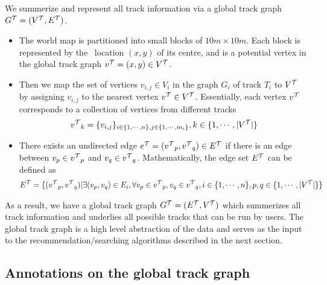 We summerize and represent all track information via a global track graph ${G^{\mathcal{T}}}=({V^{\mathcal{T}}},{E^{\mathcal{T}}})$.
\begin{itemize}
	\item The world map is partitioned into small blocks of $10m\times10m$. Each block is represented by the \gps\ location $(x,y)$ of its centre, and is a potential vertex in the global track graph ${v^{\mathcal{T}}}=(x,y)\in{V^{\mathcal{T}}}$. 
	\item Then we map the set of vertices $v_{i,j}\in V_i$ in the graph $G_i$ of track $T_i$ to ${V^{\mathcal{T}}}$ by assigning $v_{i,j}$ to the nearest vertex ${v^{\mathcal{T}}}\in{V^{\mathcal{T}}}$. Essentially, each vertex ${v^{\mathcal{T}}}$ corresponds to a collection of vertices from different tracks
	\begin{align*}
		{v^{\mathcal{T}}}_k = \{v_{i,j}\}_{i\in\{1,\cdots,n\}, j\in\{1,\cdots,m_i\}}, k\in\{1,\cdots,|{V^{\mathcal{T}}}|\}
	\end{align*}
	\item There exists an undirected edge ${e^{\mathcal{T}}}=({v^{\mathcal{T}}}_p,{v^{\mathcal{T}}}_q)\in{E^{\mathcal{T}}}$ if there is an edge between $v_p\in{v^{\mathcal{T}}}_p$ and $v_q\in{v^{\mathcal{T}}}_q$. Mathematically, the edge set ${E^{\mathcal{T}}}$ can be defined as
	\begin{align*}
		{E^{\mathcal{T}}} = \{({v^{\mathcal{T}}}_p,{v^{\mathcal{T}}}_q)|\exists (v_p,v_q)\in E_i, \forall v_p\in{v^{\mathcal{T}}}_p,v_q\in{v^{\mathcal{T}}}_q, i\in\{1,\cdots,n\},p,q\in\{1,\cdots,|{V^{\mathcal{T}}}|\}\}
	\end{align*}
\end{itemize}

As a result, we have a global track graph ${G^{\mathcal{T}}}=({E^{\mathcal{T}}},{V^{\mathcal{T}}})$ which summerizes all track information and underlies all possible tracks that can be run by users.
The global track graph is a high level abstraction of the data and serves as the input to the recommendation/searching algorithms described in the next section. 




\subsection{Annotations on the global track graph}



